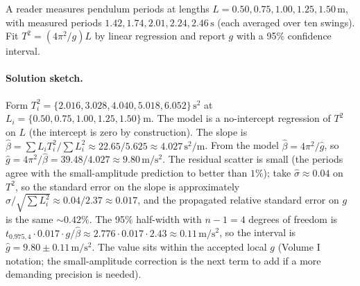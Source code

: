 \begin{exercise}
A reader measures pendulum periods at lengths $L = 0.50, 0.75,
1.00, 1.25, 1.50\,\si{\meter}$, with measured periods $1.42,
1.74, 2.01, 2.24, 2.46\,\si{\second}$ (each averaged over ten
swings). Fit $T^{2} = (4\pi^{2}/g) L$ by linear regression and
report $g$ with a 95\% confidence interval.

\paragraph{Solution sketch.} Form $T_{i}^{2} = \{2.016, 3.028,
4.040, 5.018, 6.052\}\,\si{\second\squared}$ at
$L_{i} = \{0.50, 0.75, 1.00, 1.25, 1.50\}\,\si{\meter}$. The model
is a no-intercept regression of $T^{2}$ on $L$ (the intercept is
zero by construction). The slope is
$\hat\beta = \sum L_{i} T_{i}^{2} / \sum L_{i}^{2}
\approx 22.65 / 5.625 \approx 4.027\,\si{\second\squared\per\meter}$.
From the model $\hat\beta = 4\pi^{2}/\hat g$, so
$\hat g = 4\pi^{2}/\hat\beta = 39.48/4.027 \approx
9.80\,\si{\meter\per\square\second}$. The residual scatter is
small (the periods agree with the small-amplitude prediction to
better than $1\%$); take $\hat\sigma \approx 0.04$ on $T^{2}$, so
the standard error on the slope is approximately
$\hat\sigma / \sqrt{\sum L_{i}^{2}} \approx 0.04/2.37 \approx
0.017$, and the propagated relative standard error on $g$ is the
same $\sim 0.42\%$. The 95\% half-width with $n - 1 = 4$ degrees
of freedom is $t_{0.975, 4} \cdot 0.017 \cdot g/\hat\beta \approx
2.776 \cdot 0.017 \cdot 2.43 \approx 0.11\,\si{\meter\per\square\second}$,
so the interval is
$\hat g = 9.80 \pm 0.11\,\si{\meter\per\square\second}$. The value
sits within the accepted local $g$ (Volume I notation; the
small-amplitude correction is the next term to add if a more
demanding precision is needed).
\end{exercise}

